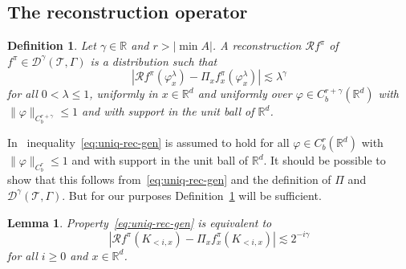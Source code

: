 \documentclass[a4paper,11pt]{article}
\newtheorem{lemma}[theorem]{Lemma}
\newtheorem{definition}[theorem]{Definition}
\theoremstyle{remark}
\newcommand{\R}{\mathbb{R}}
\begin{document}
\subsection{The reconstruction operator}

\begin{definition}\label{def:reconstruction}
   Let $\gamma \in \R$ and $r> | \min  A |$. A reconstruction $\mathcal{R}f^{\pi}$ of $f^{\pi} \in \mathcal{D}^{\gamma} ( \mathcal{T}, \Gamma )$ is a distribution such
  that
  \begin{equation}\label{eq:uniq-rec-gen}
    | \mathcal{R}f^{\pi} ( \varphi^{\lambda}_{x} ) - \Pi_{x} f^{\pi}_{x} (\varphi^{\lambda}_{x} ) | \lesssim \lambda^{\gamma}
  \end{equation}
  for all $0< \lambda \leqslant 1$, uniformly in $x \in
  \R^{d}$ and uniformly over $\varphi \in C^{r+\gamma}_b ( \R^{d} )$ with $\| \varphi
  \|_{C^{r+\gamma}_b} \leqslant 1$ and with support in the unit ball of $\R^{d}$.
\end{definition}

In~\cite{Hairer2013a} inequality~\eqref{eq:uniq-rec-gen} is assumed to hold for all $\varphi \in C^{r}_b ( \R^{d} )$ with $\| \varphi
  \|_{C^{r}_b} \leqslant 1$ and with support in the unit ball of $\R^{d}$. It should be possible to show that this follows from~\eqref{eq:uniq-rec-gen} and the definition of $\Pi$ and $\mathcal{D}^{\gamma} ( \mathcal{T}, \Gamma )$. But for our purposes Definition~\ref{def:reconstruction} will be sufficient.

\begin{lemma}
  \label{lemma:rec-equivalence}Property~{\eqref{eq:uniq-rec-gen}} is
  equivalent to
  \begin{equation}
    | \mathcal{R}f^{\pi} ( K_{< i,x} ) - \Pi_{x} f^{\pi}_{x} (
    K_{< i,x} ) | \lesssim 2^{-i \gamma} \label{eq:uniq-rec-LP}
  \end{equation}
  for all $i \geqslant 0$ and $x \in \R^{d}$. 
\end{lemma}
\end{document}
